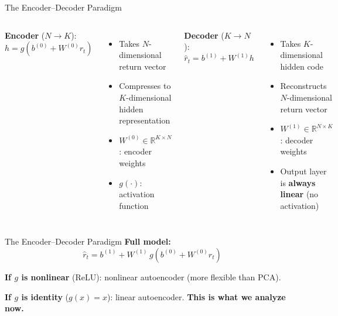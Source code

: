 \documentclass[aspectratio=169]{beamer}
\newcommand{\R}{\mathbb{R}}
\begin{document}
\begin{frame}{The Encoder--Decoder Paradigm}

\begin{columns}[T]
\textbf{Encoder} ($N \to K$):
\[
h = g\!\left(b^{(0)} + W^{(0)} r_t\right)
\]
\begin{itemize}
    \item Takes $N$-dimensional return vector
    \item Compresses to $K$-dimensional hidden representation
    \item $W^{(0)} \in \R^{K \times N}$: encoder weights
    \item $g(\cdot)$: activation function
\end{itemize}

\textbf{Decoder} ($K \to N$):
\[
\hat{r}_t = b^{(1)} + W^{(1)} h
\]
\begin{itemize}
    \item Takes $K$-dimensional hidden code
    \item Reconstructs $N$-dimensional return vector
    \item $W^{(1)} \in \R^{N \times K}$: decoder weights
    \item Output layer is \textbf{always linear} (no activation)
\end{itemize}
\end{columns}
\end{frame}
%
%
\begin{frame}{The Encoder--Decoder Paradigm}
\textbf{Full model:}
\[
\hat{r}_t = b^{(1)} + W^{(1)}\, g\!\left(b^{(0)} + W^{(0)} r_t\right)
\]

\vspace{0.5cm}
\textbf{If $g$ is nonlinear} (ReLU): nonlinear autoencoder (more flexible than PCA).

\vspace{0.5cm}
\textbf{If $g$ is identity} ($g(x) = x$): linear autoencoder. \textbf{This is what we analyze now.}
\end{frame}
%
\end{document}

